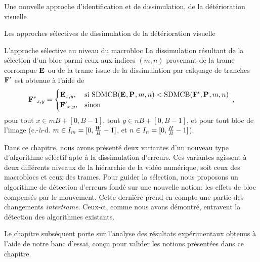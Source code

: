 \begin{chapter}{Une nouvelle approche d'identification et de dissimulation, de
la détérioration visuelle}
\begin{section}{Les approches sélectives de dissimulation de la détérioration
visuelle}
\begin{subsection}{L'approche sélective au niveau du macrobloc}
La dissimulation résultant de la sélection d'un bloc parmi ceux aux indices
$(m,n)$ provenant de la trame corrompue $\mathbf{E}_{}$ ou de la trame issue de la
dissimulation par calquage de tranches $\mathbf{F^{\prime}}_{}$ est obtenue à l'aide de
\begin{equation}
\label{eq-SelectiveConcealment}
\mathbf{F^{*}}_{x,y} =
\begin{cases}
\mathbf{E}_{x,y}, & \mathrm{si~} \textrm{SDMCB}(\mathbf{E}_{},\mathbf{P}_{},m,n) < \textrm{SDMCB}(\mathbf{F^{\prime}}_{},\mathbf{P}_{},m,n)\\
\mathbf{F^{\prime}}_{x,y}, & \mathrm{sinon}
\end{cases}\:,
\end{equation}
pour tout $x\in mB+[0,B-1]$, tout $y \in nB+[0,B-1]$, et pour tout bloc de
l'image (c.-à-d. $m \in I_{m}=[0,\frac{W}{B}-1]$, et $n \in
I_{n}=[0,\frac{H}{B}-1]$).
\end{subsection}
\end{section}

Dans ce chapitre, nous avons présenté deux variantes d'un nouveau type
d'algorithme sélectif apte à la dissimulation d'erreurs. Ces variantes agissent
à deux différents niveaux de la hiérarchie de la vidéo numérique, soit ceux des
macroblocs et ceux des trames. Pour guider la sélection, nous proposons un
algorithme de détection d'erreurs fondé sur une nouvelle notion: les effets de
bloc compensés par le mouvement. Cette dernière prend en compte une partie des
changements \textit{intertrame}. Ceux-ci, comme nous avons démontré, entravent
la détection des algorithmes existants.

Le chapitre subséquent porte sur l'analyse des résultats expérimentaux obtenus
à l'aide de notre banc d'essai, conçu pour valider les notions présentées dans
ce chapitre.
\end{chapter}